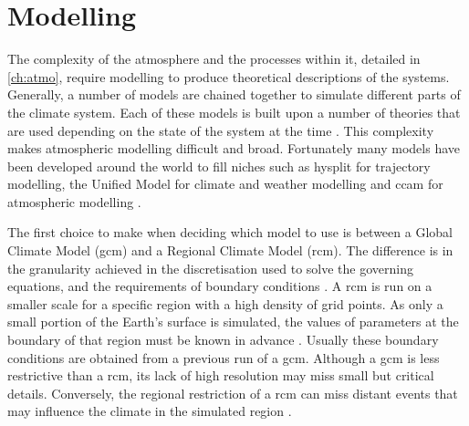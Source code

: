 \chapter{Modelling}
\label{ch:model}

The complexity of the atmosphere and the processes within it, detailed in \cref{ch:atmo}, require modelling to produce theoretical descriptions of the systems. Generally, a number of models are chained together to simulate different parts of the climate system. Each of these models is built upon a number of theories that are used depending on the state of the system at the time \citep[Chapter 21]{jacobson2005fundamentals}. This complexity makes atmospheric modelling difficult and broad. Fortunately many models have been developed around the world to fill niches such as \gls{hysplit} for trajectory modelling, the Unified Model for climate and weather modelling and \gls{ccam} for atmospheric modelling \citep{draxler:1997tga, mann:2010wb, cope:2009tz, mcgregor2008updated}.

The first choice to make when deciding which model to use is between a Global Climate Model (\gls{gcm}) and a Regional Climate Model (\gls{rcm}). The difference is in the granularity achieved in the discretisation used to solve the governing equations, and the requirements of boundary conditions \citep{thatcher:2015wy}. A \gls{rcm} is run on a smaller scale for a specific region with a high density of grid points. As only a small portion of the Earth's surface is simulated, the values of parameters at the boundary of that region must be known in advance \citep{hurley2002air}. Usually these boundary conditions are obtained from a previous run of a \gls{gcm}. Although a \gls{gcm} is less restrictive than a \gls{rcm}, its lack of high resolution may miss small but critical details. Conversely, the regional restriction of a \gls{rcm} can miss distant events that may influence the climate in the simulated region \citep[Chapter 25]{seinfeld2012atmospheric}.



